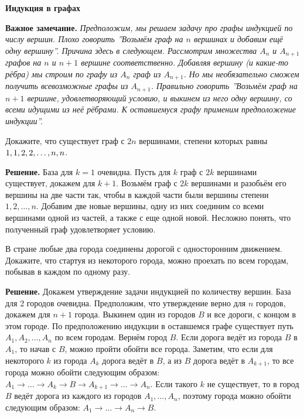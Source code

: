 \centerline{\Huge \bf Индукция в графах}

\begin{flushright}
    \scriptsize{}
\end{flushright}

\textbf{Важное замечание.} \textit{ Предположим, мы решаем задачу про графы индукцией по числу вершин. Плохо говорить ''Возьмём граф на $n$ вершинах и добавим ещё одну вершину''. Причина здесь в следующем. Рассмотрим множества $A_n$ и $A_{n+1}$ графов на $n$ и $n+1$ вершине соответственно. Добавляя вершину (и какие-то рёбра) мы строим по графу из $A_n$ граф из $A_{n+1}$. Но мы необязательно сможем получить всевозможные графы из $A_{n+1}$. Правильно говорить ''Возьмём граф на $n+1$ вершине, удовлетворяющий условию, и выкинем из него одну вершину, со всеми идущими из неё рёбрами. К оставшемуся графу применим предположение индукции''.}

 Докажите, что существует граф с $2n$ вершинами, степени которых равны $1, 1, 2, 2, \ldots,\\ n, n$.

\textbf{Решение.} База для $k = 1$ очевидна. Пусть для $k$ граф с $2k$ вершинами существует, докажем для $k+1$. Возьмём граф с $2k$ вершинами и разобьём его вершины на две части так, чтобы в каждой части были вершины степени $1, 2, \ldots, n$. Добавим две новые вершины, одну из них соединим со всеми вершинами  одной из частей, а также с еще одной новой. Несложно понять, что полученный граф удовлетворяет условию.

 В стране любые два города соединены дорогой с односторонним движением. Докажите, что стартуя из некоторого города, можно проехать по всем городам, побывав в каждом по одному разу.
    
\textbf{Решение.} Докажем утверждение задачи индукцией по количеству вершин. База для 2 городов очевидна. Предположим, что утверждение верно для $n$ городов, докажем для $n+1$ города. Выкинем один из городов $B$ и все дороги, с концом в этом городе. По предположению индукции в оставшемся графе существует путь $A_1, A_2, \ldots, A_n$ по всем городам. Вернём город $B$. Если дорога ведёт из города $B$ в $A_1$, то начав с $B$, можно пройти обойти все города. Заметим, что если для некоторого $k$ из города $A_k$ дорога ведёт в $B$, а из $B$ дорога ведёт в $A_{k+1}$, то все города можно обойти следующим образом: $A_1 \to \ldots \to A_k \to B \to A_{k+1} \to \ldots \to A_n$. Если такого $k$ не существует, то в город $B$ ведёт дорога из каждого из городов $A_1, \ldots, A_n$, поэтому города можно обойти следующим образом: $A_1 \to \ldots \to A_n \to B$.

